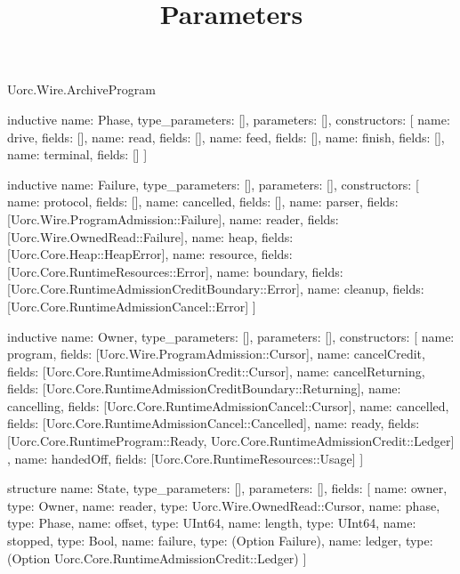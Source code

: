 \begin{lexlean}{Uorc.Wire.ArchiveProgram}
\title{Parameters}
\begin{semanticmodule}
inductive{
  name: Phase,
  type_parameters: [],
  parameters: [],
  constructors: [
    {name: drive, fields: []},
    {name: read, fields: []},
    {name: feed, fields: []},
    {name: finish, fields: []},
    {name: terminal, fields: []}
  ]
}

inductive{
  name: Failure,
  type_parameters: [],
  parameters: [],
  constructors: [
    {name: protocol, fields: []},
    {name: cancelled, fields: []},
    {name: parser, fields: [Uorc.Wire.ProgramAdmission::Failure]},
    {name: reader, fields: [Uorc.Wire.OwnedRead::Failure]},
    {name: heap, fields: [Uorc.Core.Heap::HeapError]},
    {name: resource, fields: [Uorc.Core.RuntimeResources::Error]},
    {name: boundary, fields: [Uorc.Core.RuntimeAdmissionCreditBoundary::Error]},
    {name: cleanup, fields: [Uorc.Core.RuntimeAdmissionCancel::Error]}
  ]
}

inductive{
  name: Owner,
  type_parameters: [],
  parameters: [],
  constructors: [
    {name: program, fields: [Uorc.Wire.ProgramAdmission::Cursor]},
    {name: cancelCredit, fields: [Uorc.Core.RuntimeAdmissionCredit::Cursor]},
    {name: cancelReturning, fields: [Uorc.Core.RuntimeAdmissionCreditBoundary::Returning]},
    {name: cancelling, fields: [Uorc.Core.RuntimeAdmissionCancel::Cursor]},
    {name: cancelled, fields: [Uorc.Core.RuntimeAdmissionCancel::Cancelled]},
    {
      name: ready,
      fields: [Uorc.Core.RuntimeProgram::Ready, Uorc.Core.RuntimeAdmissionCredit::Ledger]
    },
    {name: handedOff, fields: [Uorc.Core.RuntimeResources::Usage]}
  ]
}

structure{
  name: State,
  type_parameters: [],
  parameters: [],
  fields: [
    {name: owner, type: Owner},
    {name: reader, type: Uorc.Wire.OwnedRead::Cursor},
    {name: phase, type: Phase},
    {name: offset, type: UInt64},
    {name: length, type: UInt64},
    {name: stopped, type: Bool},
    {name: failure, type: (Option Failure)},
    {name: ledger, type: (Option Uorc.Core.RuntimeAdmissionCredit::Ledger)}
  ]
}


\end{semanticmodule}
\end{lexlean}
